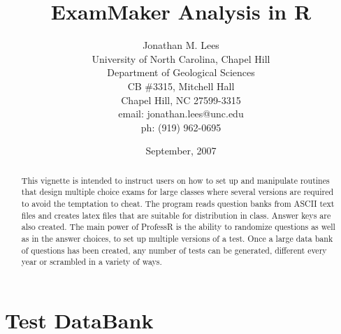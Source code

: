 \documentclass{article}
\begin{document}








\author{Jonathan M. Lees\\
University of North Carolina, Chapel Hill\\
Department of Geological Sciences\\
CB \#3315, Mitchell Hall\\
Chapel Hill, NC  27599-3315\\
email: jonathan.lees@unc.edu\\
ph: (919) 962-0695
}
\title{ExamMaker Analysis in R}
\date{September, 2007}

\maketitle


\begin{abstract}
This vignette is intended to instruct users on how to set up
and manipulate routines that design multiple choice exams 
for large classes where several versions are required to 
avoid the temptation to cheat.
The program reads question banks from ASCII text files and
creates latex files that are suitable for distribution in class.
Answer keys are also created.
The main power of ProfessR is the ability to
randomize questions as well as in the answer choices,
to set up multiple versions of a test.
Once a large data bank of questions 
has been created, any number of tests can be generated,
different every year or scrambled in a variety of ways.

\end{abstract}


\section{Test DataBank}
\end{document}
